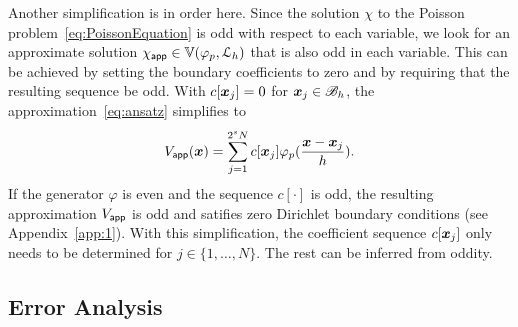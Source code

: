 Another simplification is in order here. Since the solution $\chi$ to the Poisson problem~\eqref{eq:PoissonEquation} is odd with respect to each variable, we look for an approximate solution $\appf{\chi} \in \aspace{\lattice{L}_h}{\varphi_p}$
that is also odd in each variable. This can be achieved by setting
the boundary coefficients to zero and by requiring that the resulting sequence be odd.  With $c[\vect{x}_j] = 0$ for $\vect{x}_j \in \pointset{B}_h$, the approximation~\eqref{eq:ansatz} simplifies to
\begin{equation}
\appf{V}(\vect{x}) = \sum_{j=1}^{2^sN} c[\vect{x}_j] 
\varphi_p(\frac{\vect{x} - \vect{x}_j}{h}).
\label{eq:simplifiedAnsatz}
\end{equation}
If the generator $\varphi$ is even and the sequence $c[\cdot]$ is odd,
the resulting approximation $\appf{V}$ is odd and satifies zero
Dirichlet boundary conditions (see Appendix~\ref{app:1}). With this
simplification, the coefficient sequence $c[\vect{x}_j]$ only needs to
be determined for $j \in \{1,\ldots,N\}$. The rest can be inferred
from oddity.  

\subsection{Error Analysis}

